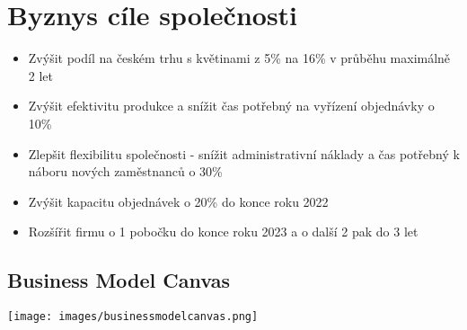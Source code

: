 \documentclass{article}
\begin{document}
\section*{Byznys cíle společnosti}
\begin{itemize}
    \item Zvýšit podíl na českém trhu s květinami z 5\% na 16\% v průběhu maximálně 2 let
    \item Zvýšit efektivitu produkce a snížit čas potřebný na vyřízení objednávky o 10\%
    \item Zlepšit flexibilitu společnosti - snížit administrativní náklady a čas potřebný k náboru nových zaměstnanců o 30\%
    \item Zvýšit kapacitu objednávek o 20\% do konce roku 2022
    \item Rozšířit firmu o 1 pobočku do konce roku 2023 a o další 2 pak do 3 let
\end{itemize}

\clearpage

\begin{landscape}

\section*{Business Model Canvas}
\texttt{[image: images/businessmodelcanvas.png]}

\end{landscape}
\end{document}
